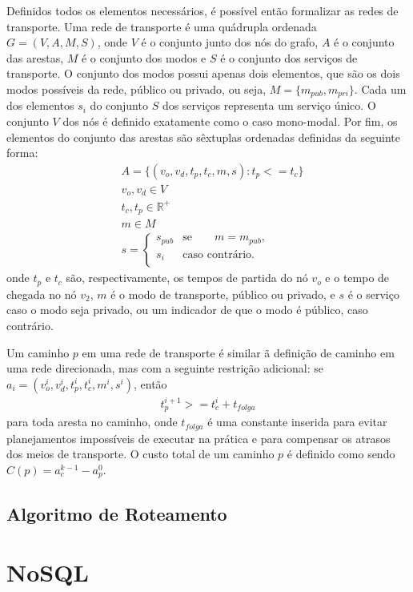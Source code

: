 Definidos todos os elementos necessários, é possível então formalizar as redes de transporte. Uma rede de transporte é uma quádrupla ordenada $G = (V, A, M, S)$, onde $V$ é o conjunto junto dos nós do grafo, $A$ é o conjunto das arestas, $M$ é o conjunto dos modos e $S$ é o conjunto dos serviços de transporte. O conjunto dos modos possui apenas dois elementos, que são os dois modos possíveis da rede, público ou privado, ou seja, $M = \{m_{pub}, m_{pri}\}$.
Cada um dos elementos $s_i$ do conjunto $S$ dos serviços representa um serviço único.
O conjunto $V$ dos nós é definido exatamente como o caso mono-modal. Por fim, os elementos do conjunto das arestas são sêxtuplas ordenadas definidas da seguinte forma:
\begin{align*}
& A = \{ (v_o, v_d, t_p, t_c, m, s) : t_p <= t_c \} \\
& v_o, v_d \in V \\
& t_c, t_p \in \mathbb{R^+} \\
& m \in M \\
& s = \left\{
	\begin{array}{cr}
		s_{pub} &  \text{se} \qquad m = m_{pub}, \\
		s_i  & \text{caso contrário}. \\
	\end{array}
	\right.
\end{align*}
onde $t_p$ e $t_c$ são, respectivamente, os tempos de partida do nó $v_o$ e o tempo de chegada no nó $v_2$, $m$ é o modo de transporte, público ou privado, e $s$ é o serviço caso o modo seja privado, ou um indicador de que o modo é público, caso contrário.

Um caminho $p$ em uma rede de transporte é similar ã definição de caminho em uma rede direcionada, mas com a seguinte restrição adicional: se $a_i = (v_o^i, v_d^i, t_p^i, t_c^i, m^i, s^i)$, então
\begin{align*}
t_p^{i+1} >= t_c^i + t_{folga}
\end{align*}
para toda aresta no caminho, onde $t_{folga}$ é uma constante inserida para evitar planejamentos impossíveis de executar na prática e para compensar os atrasos dos meios de transporte. 
O custo total de um caminho $p$ é definido como sendo $C(p) = a_c^{k-1} - a_p^0$.

\subsection{Algoritmo de Roteamento}

\section{NoSQL}


